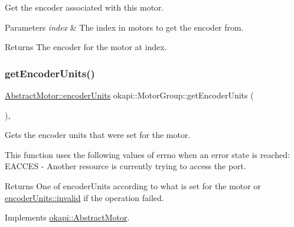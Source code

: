 Get the encoder associated with this motor.


\begin{DoxyParams}{Parameters}
{\em index} & The index in {\ttfamily motors} to get the encoder from. \\
\hline
\end{DoxyParams}
\begin{DoxyReturn}{Returns}
The encoder for the motor at {\ttfamily index}. 
\end{DoxyReturn}
\mbox{\label{classokapi_1_1MotorGroup_a1bc6347732e108a171b6e9a846722817}} 
\subsubsection{\texorpdfstring{getEncoderUnits()}{getEncoderUnits()}}
{\footnotesize\ttfamily \mbox{\hyperlink{classokapi_1_1AbstractMotor_ae811cd825099f2defadeb1b7f7e7764c}{Abstract\+Motor\+::encoder\+Units}} okapi\+::\+Motor\+Group\+::get\+Encoder\+Units (\begin{DoxyParamCaption}{ }\end{DoxyParamCaption})\hspace{0.3cm}{\ttfamily [override]}, {\ttfamily [virtual]}}

Gets the encoder units that were set for the motor.

This function uses the following values of errno when an error state is reached\+: E\+A\+C\+C\+ES -\/ Another resource is currently trying to access the port.

\begin{DoxyReturn}{Returns}
One of encoder\+Units according to what is set for the motor or \mbox{\hyperlink{classokapi_1_1AbstractMotor_ae811cd825099f2defadeb1b7f7e7764cafedb2d84cafe20862cb4399751a8a7e3}{encoder\+Units\+::invalid}} if the operation failed. 
\end{DoxyReturn}


Implements \mbox{\hyperlink{classokapi_1_1AbstractMotor_ae8225381a81ca0b54469949a6022b775}{okapi\+::\+Abstract\+Motor}}.

\mbox{\label{classokapi_1_1MotorGroup_a1fece81a588e0d2ab40a08a1bcb86475}} 
